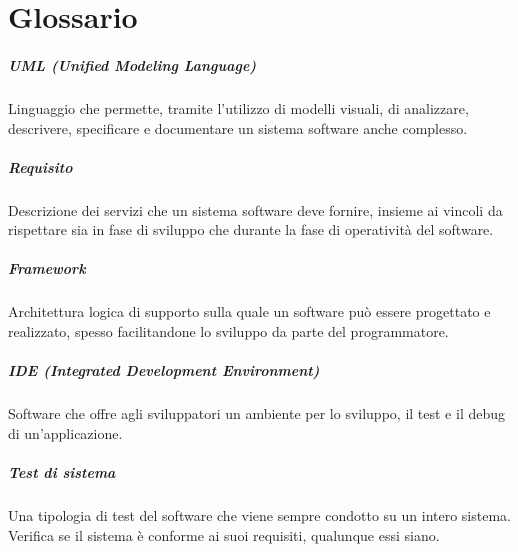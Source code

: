 \cleardoublepage
\chapter{Glossario}
\label{cap:glossario}
\nocite{*}

\paragraph*{UML (Unified Modeling Language)} Linguaggio che permette, tramite l'utilizzo di modelli visuali, di analizzare, descrivere, specificare e documentare un sistema software anche complesso.
\label{para:uml-definition}

\paragraph*{Requisito} Descrizione dei servizi che un sistema software deve fornire, insieme ai vincoli da rispettare sia in fase di sviluppo che durante la fase di operatività del software.
\label{para:requisito-definition}

\paragraph*{Framework} Architettura logica di supporto sulla quale un software può essere progettato e realizzato, spesso facilitandone lo sviluppo da parte del programmatore.
\label{para:framework-definition}

\paragraph*{IDE (Integrated Development Environment)} Software che offre agli sviluppatori un ambiente per lo sviluppo, il test e il debug di un'applicazione.
\label{para:ide-definition}

\paragraph*{Test di sistema} Una tipologia di test del software che viene sempre condotto su un intero sistema. Verifica se il sistema è conforme ai suoi requisiti, qualunque essi siano.
\label{para:test-definition}